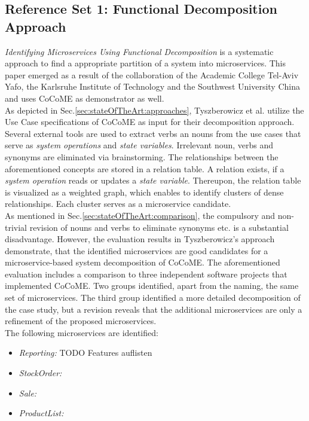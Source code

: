 \subsection{Reference Set 1: Functional Decomposition Approach}
\textit{Identifying Microservices Using Functional Decomposition} \cite{FunctionalDecompositionHeinrich} is a systematic approach to find a appropriate partition of a system into microservices. This paper emerged as a result of the collaboration of the Academic College Tel-Aviv Yafo, the Karlsruhe Institute of Technology and the Southwest University China and uses CoCoME as demonstrator as well.\\
As depicted in Sec.\ref{sec:stateOfTheArt:approaches}, Tyszberowicz et al. utilize the Use Case specifications of CoCoME \cite{CoCoMEOld} as input for their decomposition approach. Several external tools are used to extract verbs an nouns from the use cases that serve as \textit{system operations} and \textit{state variables}. Irrelevant noun, verbs and synonyms are eliminated via brainstorming. The relationships between the aforementioned concepts are stored in a relation table. A relation exists, if a \textit{system operation} reads or updates a \textit{state variable}. Thereupon, the relation table is visualized as a weighted graph, which enables to identify clusters of dense relationships. Each cluster serves as a microservice candidate.\\
As mentioned in Sec.\ref{sec:stateOfTheArt:comparison}, the compulsory and non-trivial revision of nouns and verbs to eliminate synonyms etc. is a substantial disadvantage. However, the evaluation results in Tyszberowicz's approach demonstrate, that the identified microservices are good candidates for a microservice-based system decomposition of CoCoME. The aforementioned evaluation includes a comparison to three independent software projects that implemented CoCoME. Two groups identified, apart from the naming, the same set of microservices. The third group identified a more detailed decomposition of the case study, but a revision reveals that the additional microservices are only a refinement of the proposed microservices. \\
The following microservices are identified: 
\begin{itemize}
    \item  \textit{Reporting:} TODO Features auflisten  %
    \item \textit{StockOrder:}
    \item \textit{Sale:}
    \item \textit{ProductList:}
\end{itemize}

